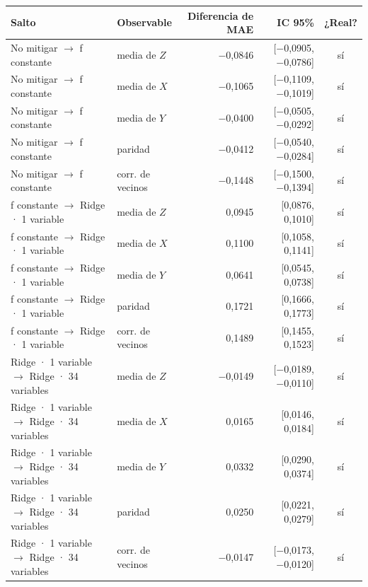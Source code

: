 \begin{table}[htbp]
    \centering
    {\footnotesize
    \begin{tabular}{@{}llrrc@{}}
        \toprule
        \textbf{Salto} & \textbf{Observable} & \textbf{Diferencia de MAE} & \textbf{IC 95\%} & \textbf{¿Real?} \\
        \midrule
        No mitigar $\rightarrow$ f constante & media de $Z$ & $-$0,0846 & [$-$0,0905, $-$0,0786] & sí \\
        No mitigar $\rightarrow$ f constante & media de $X$ & $-$0,1065 & [$-$0,1109, $-$0,1019] & sí \\
        No mitigar $\rightarrow$ f constante & media de $Y$ & $-$0,0400 & [$-$0,0505, $-$0,0292] & sí \\
        No mitigar $\rightarrow$ f constante & paridad & $-$0,0412 & [$-$0,0540, $-$0,0284] & sí \\
        No mitigar $\rightarrow$ f constante & corr. de vecinos & $-$0,1448 & [$-$0,1500, $-$0,1394] & sí \\
        f constante $\rightarrow$ Ridge · 1 variable & media de $Z$ & 0,0945 & [0,0876, 0,1010] & sí \\
        f constante $\rightarrow$ Ridge · 1 variable & media de $X$ & 0,1100 & [0,1058, 0,1141] & sí \\
        f constante $\rightarrow$ Ridge · 1 variable & media de $Y$ & 0,0641 & [0,0545, 0,0738] & sí \\
        f constante $\rightarrow$ Ridge · 1 variable & paridad & 0,1721 & [0,1666, 0,1773] & sí \\
        f constante $\rightarrow$ Ridge · 1 variable & corr. de vecinos & 0,1489 & [0,1455, 0,1523] & sí \\
        Ridge · 1 variable $\rightarrow$ Ridge · 34 variables & media de $Z$ & $-$0,0149 & [$-$0,0189, $-$0,0110] & sí \\
        Ridge · 1 variable $\rightarrow$ Ridge · 34 variables & media de $X$ & 0,0165 & [0,0146, 0,0184] & sí \\
        Ridge · 1 variable $\rightarrow$ Ridge · 34 variables & media de $Y$ & 0,0332 & [0,0290, 0,0374] & sí \\
        Ridge · 1 variable $\rightarrow$ Ridge · 34 variables & paridad & 0,0250 & [0,0221, 0,0279] & sí \\
        Ridge · 1 variable $\rightarrow$ Ridge · 34 variables & corr. de vecinos & $-$0,0147 & [$-$0,0173, $-$0,0120] & sí \\

\end{tabular}}
\end{table}
